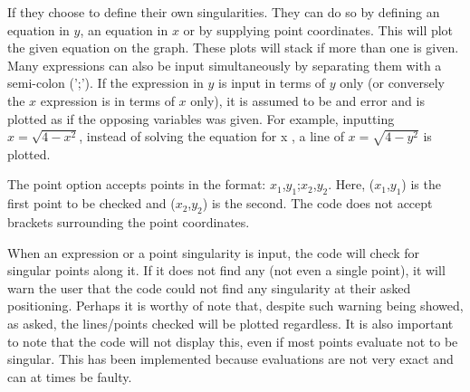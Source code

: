 \documentclass[12pt]{report}
\begin{document}
If they choose to define their own singularities. They can do so by defining an equation in $y$, an equation in $x$ or by supplying point coordinates. This will plot the given equation on the graph. These plots will stack if more than one is given. Many expressions can also be input simultaneously by separating them with a semi-colon (';'). If the expression in $y$ is input in terms of $y$ only (or conversely the $x$ expression is in terms of $x$ only), it is assumed to be and error and is plotted as if the opposing variables was given. For example, inputting $x = \sqrt{4 - x^2}$, instead of solving the equation for x , a line of $x = \sqrt{4 - y^2}$ is plotted.

The point option accepts points in the format: $x_1$,$y_1$;$x_2$,$y_2$. Here, ($x_1$,$y_1$) is the first point to be checked and ($x_2$,$y_2$) is the second. The code does not accept brackets surrounding the point coordinates.

When an expression or a point singularity is input, the code will check for singular points along it. If it does not find any (not even a single point), it will warn the user that the code could not find any singularity at their asked positioning. Perhaps it is worthy of note that, despite such warning being showed, as asked, the lines/points checked will be plotted regardless. It is also important to note that the code will not display this, even if most points evaluate not to be singular. This has been implemented because evaluations are not very exact and can at times be faulty.
\end{document}
